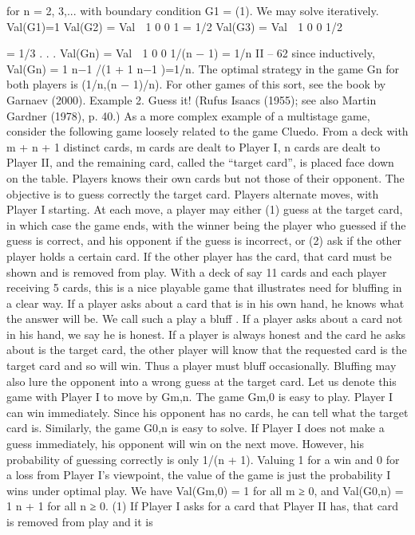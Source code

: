 for n = 2, 3,...
with boundary condition G1 = (1). We may solve iteratively.
Val(G1)=1
Val(G2) = Val  1 0
0 1
= 1/2
Val(G3) = Val  1 0
0 1/2

= 1/3
.
.
.
Val(Gn) = Val  1 0
0 1/(n − 1)
= 1/n
II – 62
since inductively, Val(Gn) = 1
n−1 /(1 + 1
n−1 )=1/n. The optimal strategy in the game Gn
for both players is (1/n,(n − 1)/n). For other games of this sort, see the book by Garnaev
(2000).
Example 2. Guess it! (Rufus Isaacs (1955); see also Martin Gardner (1978), p. 40.) As
a more complex example of a multistage game, consider the following game loosely related
to the game Cluedo. From a deck with m + n + 1 distinct cards, m cards are dealt to
Player I, n cards are dealt to Player II, and the remaining card, called the “target card”,
is placed face down on the table. Players knows their own cards but not those of their
opponent. The objective is to guess correctly the target card. Players alternate moves,
with Player I starting. At each move, a player may either
(1) guess at the target card, in which case the game ends, with the winner being the player
who guessed if the guess is correct, and his opponent if the guess is incorrect, or
(2) ask if the other player holds a certain card. If the other player has the card, that card
must be shown and is removed from play.
With a deck of say 11 cards and each player receiving 5 cards, this is a nice playable
game that illustrates need for bluffing in a clear way. If a player asks about a card that is
in his own hand, he knows what the answer will be. We call such a play a bluff . If a player
asks about a card not in his hand, we say he is honest. If a player is always honest and
the card he asks about is the target card, the other player will know that the requested
card is the target card and so will win. Thus a player must bluff occasionally. Bluffing
may also lure the opponent into a wrong guess at the target card.
Let us denote this game with Player I to move by Gm,n. The game Gm,0 is easy to
play. Player I can win immediately. Since his opponent has no cards, he can tell what the
target card is. Similarly, the game G0,n is easy to solve. If Player I does not make a guess
immediately, his opponent will win on the next move. However, his probability of guessing
correctly is only 1/(n + 1). Valuing 1 for a win and 0 for a loss from Player I’s viewpoint,
the value of the game is just the probability I wins under optimal play. We have
Val(Gm,0) = 1 for all m ≥ 0, and Val(G0,n) = 1
n + 1
for all n ≥ 0. (1)
If Player I asks for a card that Player II has, that card is removed from play and it is
